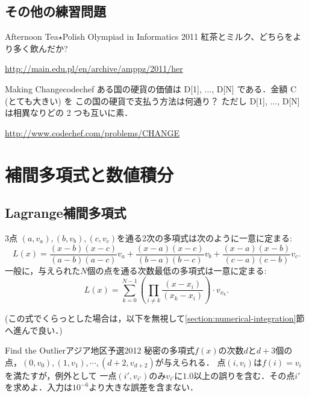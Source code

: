 \begin{versionbeta}
\section{その他の練習問題}

\begin{pbox}{Afternoon Tea$\star$}{Polish Olympiad in Informatics 2011}
紅茶とミルク、どちらをより多く飲んだか?

\url{http://main.edu.pl/en/archive/amppz/2011/her}
\end{pbox}

\begin{pbox}{Making Change}{codechef}
ある国の硬貨の価値は D[1], ..., D[N] である．金額 C (とても大きい) を
この国の硬貨で支払う方法は何通り？
ただし D[1], ..., D[N] は相異なりどの 2 つも互いに素．  

\url{http://www.codechef.com/problems/CHANGE}
\end{pbox}

\chapter{補間多項式と数値積分}\label{chapter:integral}

\section{Lagrange補間多項式}

3点 $(a,v_a), (b,v_b), (c, v_c)$を通る2次の多項式は次のように一意に定まる:
\begin{equation}
L(x) = \frac{(x-b)(x-c)}{(a-b)(a-c)}v_a + \frac{(x-a)(x-c)}{(b-a)(b-c)}v_b + \frac{(x-a)(x-b)}{(c-a)(c-b)}v_c. \label{eq:interpolate3}  
\end{equation}
一般に，与えられた$N$個の点を通る次数最低の多項式は一意に定まる:
$$
L(x) = \sum_{k=0}^{N-1} \left(\prod_{i\neq k}\frac{(x-x_i)}{(x_k-x_i)}\right)\cdot{}v_{x_k}.
$$

(この式でくらっとした場合は，以下を無視して\ref{section:numerical-integration}節へ進んで良い．)

\begin{pbox}{Find the Outlier}{アジア地区予選2012}
秘密の多項式$f(x)$の次数$d$と$d+3$個の点，$(0,v_0), (1,v_1), \cdots,(d+2,v_{d+2})$が与えられる．
点$(i,v_i)$は$f(i)=v_i$を満たすが，例外として
一点$(i',v_{i'})$のみ$v_{i'}$に$1.0$以上の誤りを含む．その点$i'$を求めよ．入力は$10^{-6}$より大きな誤差を含まない．

\end{pbox}


\end{versionbeta}
